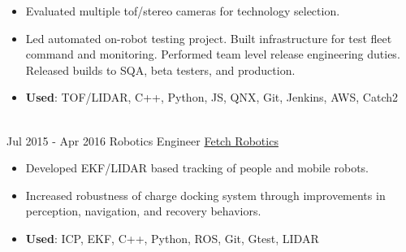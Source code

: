 \documentclass[letterpaper]{twentysecondcv} %
\begin{document}
\begin{twenty}
{{\begin{itemize}
              Refactored infrastructure producing documented unit tested code.
        \item Evaluated multiple tof/stereo cameras for technology selection.
        \item Led automated on-robot testing project.
              Built infrastructure for test fleet command and monitoring.
              Performed team level release engineering duties.
              Released builds to SQA, beta testers, and production.
        \item \textbf{Used}: TOF/LIDAR, C++, Python, JS, QNX, Git, Jenkins, AWS, Catch2
        \end{itemize}}
        }
    \\
    \twentyitem
   		{Jul 2015 -}
		{Apr 2016}
        {Robotics Engineer}
        {\href{http://www.fetchrobotics.com}{Fetch Robotics}}
        {}
        {
        {\begin{itemize}
          \item Developed EKF/LIDAR based tracking of people and mobile robots.
          \item Increased robustness of charge docking system through improvements in perception, navigation, and recovery behaviors.
          \item \textbf{Used}: ICP, EKF, C++, Python, ROS, Git, Gtest, LIDAR
        \end{itemize}}
        }

\end{twenty}

\end{document}
